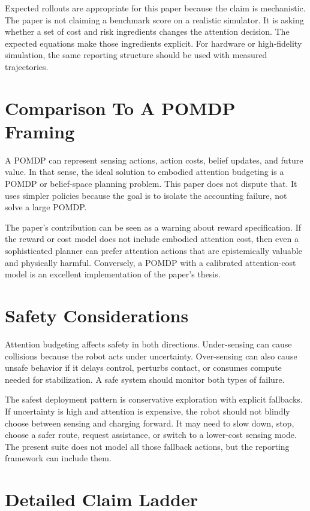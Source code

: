 \documentclass{article}
\begin{document}
Expected rollouts are appropriate for this paper because the claim is
mechanistic. The paper is not claiming a benchmark score on a realistic
simulator. It is asking whether a set of cost and risk ingredients changes the
attention decision. The expected equations make those ingredients explicit.
For hardware or high-fidelity simulation, the same reporting structure should
be used with measured trajectories.

\section{Comparison To A POMDP Framing}

A POMDP can represent sensing actions, action costs, belief updates, and future
value. In that sense, the ideal solution to embodied attention budgeting is a
POMDP or belief-space planning problem. This paper does not dispute that. It
uses simpler policies because the goal is to isolate the accounting failure,
not solve a large POMDP.

The paper's contribution can be seen as a warning about reward specification.
If the reward or cost model does not include embodied attention cost, then even
a sophisticated planner can prefer attention actions that are epistemically
valuable and physically harmful. Conversely, a POMDP with a calibrated
attention-cost model is an excellent implementation of the paper's thesis.

\section{Safety Considerations}

Attention budgeting affects safety in both directions. Under-sensing can cause
collisions because the robot acts under uncertainty. Over-sensing can also
cause unsafe behavior if it delays control, perturbs contact, or consumes
compute needed for stabilization. A safe system should monitor both types of
failure.

The safest deployment pattern is conservative exploration with explicit
fallbacks. If uncertainty is high and attention is expensive, the robot should
not blindly choose between sensing and charging forward. It may need to slow
down, stop, choose a safer route, request assistance, or switch to a lower-cost
sensing mode. The present suite does not model all those fallback actions, but
the reporting framework can include them.

\section{Detailed Claim Ladder}
\end{document}
